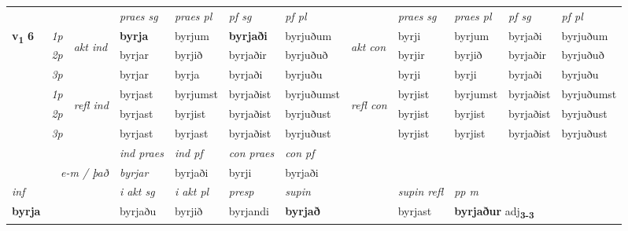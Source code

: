 \begin{longtable}[l]{X>{\footnotesize\itshape}llXXXXlXXXX}
\midrule

 & &   & \textit{praes sg}  & \textit{praes pl}    & \textit{ pf sg} & \textit{pf pl} & & \textit{praes sg}  & \textit{praes pl}    & \textit{pf sg} & \textit{pf pl }  \\ \cmidrule{4-7} \cmidrule{9-12}
 \multirow{2}{*}{{{\textbf{v{\textsubscript{1}}} \Large{\textbf{6}}}}}  & 1p & \multirow{3}{*}{\begin{turn}{90}\textit{akt ind}\end{turn}} & \textbf{byrja} & byrjum & \textbf{byrjaði} & byrjuðum & \multirow{3}{*}{\begin{turn}{90}\textit{akt con}\end{turn}} &byrji & byrjum & byrjaði & byrjuðum\\*
 & 2p &  &  byrjar  & byrjið & byrjaðir & byrjuðuð & & byrjir & byrjið & byrjaðir & byrjuðuð \\*
 & 3p &  & byrjar & byrja & byrjaði & byrjuðu & & byrji & byrji& byrjaði & byrjuðu \\*
\cmidrule{4-7} \cmidrule{9-12}
 & 1p & \multirow{3}{*}{\begin{turn}{90}\textit{refl ind}\end{turn}}  & byrjast & byrjumst & byrjaðist & byrjuðumst & \multirow{3}{*}{\begin{turn}{90}\textit{refl con}\end{turn}}  &byrjist & byrjumst & byrjaðist & byrjuðumst \\*
 & 2p &  & byrjast & byrjist & byrjaðist & byrjuðust & &byrjist & byrjist & byrjaðist & byrjuðust \\*
 & 3p  & & byrjast & byrjast & byrjaðist & byrjuðust & & byrjist & byrjist& byrjaðist & byrjuðust \\*
\cmidrule{4-7} \cmidrule{9-12}

   && &  \textit{ind praes} & \textit{ind pf} & \textit{con praes} & \textit{con pf} \\*
\multicolumn{3}{r}{\textit{e-m / það}} & byrjar & byrjaði & byrji & byrjaði \\*

\cmidrule{4-7}
   {\textit{inf}} & &  & \textit{i akt sg} & \textit{i akt pl}   & \textit{presp} & \textit{supin} && \textit{supin refl} & \textit{pp m} \\*
  {\textbf{byrja}} & && byrjaðu  & byrjið   & byrjandi &  \textbf{byrjað} && byrjast & \multicolumn{2}{l}{\textbf{byrjaður} adj\textbf{\textsubscript{3-3}}} \\*

\midrule


\end{longtable}
